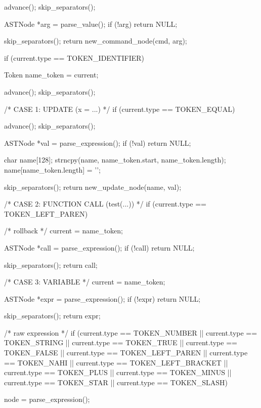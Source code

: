 \documentclass{article}
\begin{document}
{{    advance();
    skip_separators();

    ASTNode *arg = parse_value();
    if (!arg) return NULL;

    skip_separators();
    return new_command_node(cmd, arg);
}









if (current.type == TOKEN_IDENTIFIER) {

    Token name_token = current;

    advance();
    skip_separators();

    /* CASE 1: UPDATE (x = ...) */
    if (current.type == TOKEN_EQUAL) {

        advance();
        skip_separators();

        ASTNode *val = parse_expression();
        if (!val) return NULL;

        char name[128];
        strncpy(name, name_token.start, name_token.length);
        name[name_token.length] = '\0';

        skip_separators();
        return new_update_node(name, val);
    }

    /* CASE 2: FUNCTION CALL (test(...)) */
    if (current.type == TOKEN_LEFT_PAREN) {

        /* rollback */
        current = name_token;

        ASTNode *call = parse_expression();
        if (!call) return NULL;

        skip_separators();
        return call;
    }

    /* CASE 3: VARIABLE */
    current = name_token;

    ASTNode *expr = parse_expression();
    if (!expr) return NULL;

    skip_separators();
    return expr;
}







/* raw expression */
 if (current.type == TOKEN_NUMBER ||
    current.type == TOKEN_STRING ||
    current.type == TOKEN_TRUE   ||
    current.type == TOKEN_FALSE  ||
    current.type == TOKEN_LEFT_PAREN ||
    current.type == TOKEN_NAHI   ||
    current.type == TOKEN_LEFT_BRACKET ||
    current.type == TOKEN_PLUS ||
    current.type == TOKEN_MINUS ||
    current.type == TOKEN_STAR ||
    current.type == TOKEN_SLASH)
{

    node = parse_expression();

}}
\end{document}
